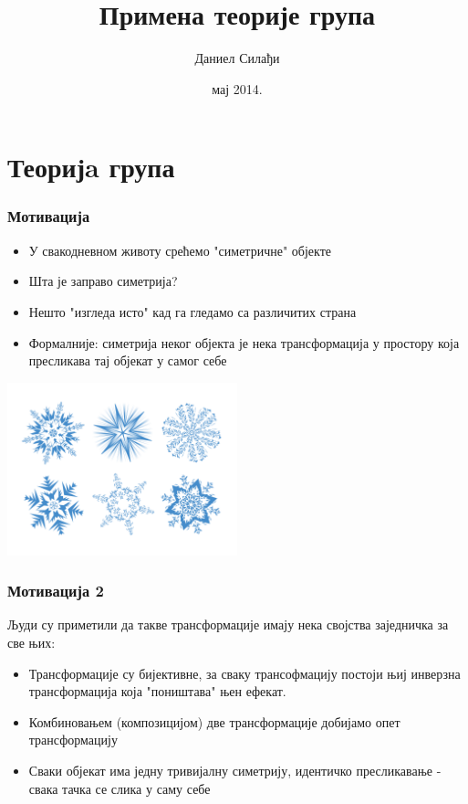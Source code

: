 \documentclass{beamer}
\title[Примена теорије група]{Примена теорије група}
\author[Даниел Силађи ]{Даниел Силађи}
\date[мај 2014.]{мај 2014.}
\institute[Гимназија Јован Јовановић Змај]{Гимназија Јован Јовановић Zmaj}
\theoremstyle{plain}
\theoremstyle{definition}
\begin{document}
\section{Теоријa група}
\begin{frame}
\titlepage
\end{frame}

\begin{frame}
\frametitle{Мотивација}
\begin{itemize}
\item У свакодневном животу срећемо "симетричне" објекте
\item Шта је заправо симетрија?
\item Нешто "изгледа исто" кад га гледамо са различитих страна
\item Формалније: симетрија неког објекта је нека трансформација у простору која пресликава тај објекат у самог себе
\end{itemize}
\centering
\vspace{-0.7cm}
\includegraphics[height=5cm]{sneg}
\end{frame}

\begin{frame}
\frametitle{Мотивација 2}
Људи су приметили да такве трансформације имају нека својства заједничка за све њих:
\begin{itemize}
\item Трансформације су бијективне, за сваку трансофмацију постоји њиј инверзна трансформација која "поништава" њен ефекат.
\item Комбиновањем (композицијом) две трансформације добијамо опет трансформацију
\item Сваки објекат има једну тривијалну симетрију, идентичко пресликавање - свака тачка се слика у саму себе
\end{itemize}
\end{frame}
\end{document}
